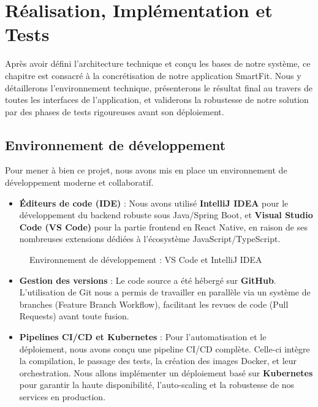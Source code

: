 \chapter{Réalisation, Implémentation et Tests}

Après avoir défini l'architecture technique et conçu les bases de notre système, ce chapitre est consacré à la concrétisation de notre application SmartFit. Nous y détaillerons l'environnement technique, présenterons le résultat final au travers de toutes les interfaces de l'application, et validerons la robustesse de notre solution par des phases de tests rigoureuses avant son déploiement.

\section{Environnement de développement}
Pour mener à bien ce projet, nous avons mis en place un environnement de développement moderne et collaboratif.

\begin{itemize}
    \item \textbf{Éditeurs de code (IDE)} : Nous avons utilisé \textbf{IntelliJ IDEA} pour le développement du backend robuste sous Java/Spring Boot, et \textbf{Visual Studio Code (VS Code)} pour la partie frontend en React Native, en raison de ses nombreuses extensions dédiées à l'écosystème JavaScript/TypeScript.
\end{itemize}

\begin{figure}[H]
    \centering
\caption{Environnement de développement : VS Code et IntelliJ IDEA}
\end{figure}

\begin{itemize}
    \item \textbf{Gestion des versions} : Le code source a été hébergé sur \textbf{GitHub}. L'utilisation de Git nous a permis de travailler en parallèle via un système de branches (Feature Branch Workflow), facilitant les revues de code (Pull Requests) avant toute fusion.
    \item \textbf{Pipelines CI/CD et Kubernetes} : Pour l'automatisation et le déploiement, nous avons conçu une pipeline CI/CD complète. Celle-ci intègre la compilation, le passage des tests, la création des images Docker, et leur orchestration. Nous allons implémenter un déploiement basé sur \textbf{Kubernetes} pour garantir la haute disponibilité, l'auto-scaling et la robustesse de nos services en production.
\end{itemize}

